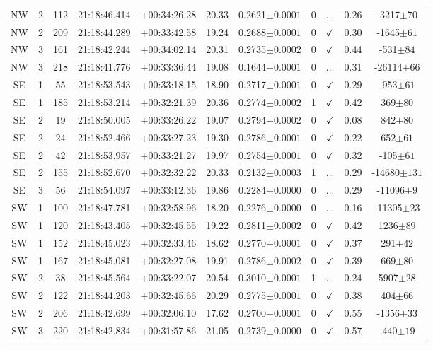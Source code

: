 \begin{landscape}
\begin{longtable}{ccccccccccc}
	NW & 2 & 112 & 21:18:46.414 & +00:34:26.28 & 20.33 & 0.2621$\pm{0.0001}$ & 0 & ... & 0.26 & -3217$\pm{70}$ \\
	NW & 2 & 209 & 21:18:44.289 & +00:33:42.58 & 19.24 & 0.2688$\pm{0.0001}$ & 0 & $\checkmark$ & 0.30 & -1645$\pm{61}$ \\
	NW & 3 & 161 & 21:18:42.244 & +00:34:02.14 & 20.31 & 0.2735$\pm{0.0002}$ & 0 & $\checkmark$ & 0.44 & -531$\pm{84}$ \\
	NW & 3 & 218 & 21:18:41.776 & +00:33:36.44 & 19.08 & 0.1644$\pm{0.0001}$ & 0 & ... & 0.31 & -26114$\pm{66}$ \\
	SE & 1 & 55 & 21:18:53.543 & +00:33:18.15 & 18.90 & 0.2717$\pm{0.0001}$ & 0 & $\checkmark$ & 0.29 & -953$\pm{61}$ \\
	SE & 1 & 185 & 21:18:53.214 & +00:32:21.39 & 20.36 & 0.2774$\pm{0.0002}$ & 1 & $\checkmark$ & 0.42 & 369$\pm{80}$ \\
	SE & 2 & 19 & 21:18:50.005 & +00:33:26.22 & 19.07 & 0.2794$\pm{0.0002}$ & 0 & $\checkmark$ & 0.08 & 842$\pm{80}$ \\
	SE & 2 & 24 & 21:18:52.466 & +00:33:27.23 & 19.30 & 0.2786$\pm{0.0001}$ & 0 & $\checkmark$ & 0.22 & 652$\pm{61}$ \\
	SE & 2 & 42 & 21:18:53.957 & +00:33:21.27 & 19.97 & 0.2754$\pm{0.0001}$ & 0 & $\checkmark$ & 0.32 & -105$\pm{61}$ \\
	SE & 2 & 155 & 21:18:52.670 & +00:32:32.22 & 20.33 & 0.2132$\pm{0.0003}$ & 1 & ... & 0.29 & -14680$\pm{131}$ \\
	SE & 3 & 56 & 21:18:54.097 & +00:33:12.36 & 19.86 & 0.2284$\pm{0.0000}$ & 0 & ... & 0.29 & -11096$\pm{9}$ \\
	SW & 1 & 100 & 21:18:47.781 & +00:32:58.96 & 18.20 & 0.2276$\pm{0.0000}$ & 0 & ... & 0.16 & -11305$\pm{23}$ \\
	SW & 1 & 120 & 21:18:43.405 & +00:32:45.55 & 19.22 & 0.2811$\pm{0.0002}$ & 0 & $\checkmark$ & 0.42 & 1236$\pm{89}$ \\
	SW & 1 & 152 & 21:18:45.023 & +00:32:33.46 & 18.62 & 0.2770$\pm{0.0001}$ & 0 & $\checkmark$ & 0.37 & 291$\pm{42}$ \\
	SW & 1 & 167 & 21:18:45.081 & +00:32:27.08 & 19.91 & 0.2786$\pm{0.0002}$ & 0 & $\checkmark$ & 0.39 & 669$\pm{80}$ \\
	SW & 2 & 38 & 21:18:45.564 & +00:33:22.07 & 20.54 & 0.3010$\pm{0.0001}$ & 1 & ... & 0.24 & 5907$\pm{28}$ \\
	SW & 2 & 122 & 21:18:44.203 & +00:32:45.66 & 20.29 & 0.2775$\pm{0.0001}$ & 0 & $\checkmark$ & 0.38 & 404$\pm{66}$ \\
	SW & 2 & 206 & 21:18:42.699 & +00:32:06.10 & 17.62 & 0.2700$\pm{0.0001}$ & 0 & $\checkmark$ & 0.55 & -1356$\pm{33}$ \\
	SW & 3 & 220 & 21:18:42.834 & +00:31:57.86 & 21.05 & 0.2739$\pm{0.0000}$ & 0 & $\checkmark$ & 0.57 & -440$\pm{19}$ \\
			\hline
		\label{2tbl:MSJ211849.1+003337.3}
	\end{longtable}
\end{landscape}


